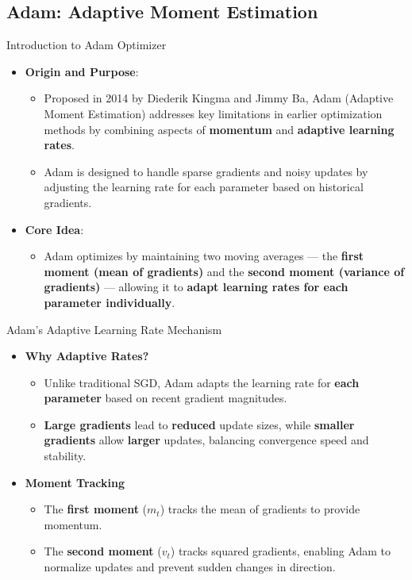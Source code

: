 \documentclass[serif, aspectratio=169]{beamer}
\begin{document}
\subsection{Adam: Adaptive Moment Estimation}
\begin{frame}{Introduction to Adam Optimizer}
    \begin{itemize}
        \item \textbf{Origin and Purpose}: 
        \begin{itemize}
            \item Proposed in 2014 by Diederik Kingma and Jimmy Ba, Adam (Adaptive Moment Estimation) addresses key limitations in earlier optimization methods by combining aspects of \textbf{momentum} and \textbf{adaptive learning rates}.
            \item Adam is designed to handle sparse gradients and noisy updates by adjusting the learning rate for each parameter based on historical gradients.
        \end{itemize}
        \item \textbf{Core Idea}:
        \begin{itemize}
            \item Adam optimizes by maintaining two moving averages — the \textbf{first moment (mean of gradients)} and the \textbf{second moment (variance of gradients)} — allowing it to \textbf{adapt learning rates for each parameter individually}.
        \end{itemize}
    \end{itemize}
\end{frame}

\begin{frame}{Adam’s Adaptive Learning Rate Mechanism}
    \begin{itemize}
        \item \textbf{Why Adaptive Rates?}
        \begin{itemize}
            \item Unlike traditional SGD, Adam adapts the learning rate for \textbf{each parameter} based on recent gradient magnitudes.
            \item \textbf{Large gradients} lead to \textbf{reduced} update sizes, while \textbf{smaller gradients} allow \textbf{larger} updates, balancing convergence speed and stability.
        \end{itemize}
        \item \textbf{Moment Tracking}
        \begin{itemize}
            \item The \textbf{first moment} ($m_t$) tracks the mean of gradients to provide momentum.
            \item The \textbf{second moment} ($v_t$) tracks squared gradients, enabling Adam to normalize updates and prevent sudden changes in direction.
        \end{itemize}
    \end{itemize}
\end{frame}
\end{document}
